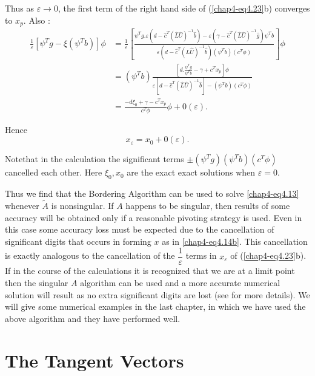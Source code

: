  Thus as $\varepsilon  \rightarrow 0$, the first term of the right
 hand side of (\ref{chap4-eq4.23}b) converges to $x_p$. Also : 
{\fontsize{10pt}{12pt}\selectfont
  \begin{align*}
\frac{1}{\varepsilon }[\psi ^T g- \xi (\psi ^Tb)]\phi
&=\frac{1}{\varepsilon } \left[ \frac{\psi ^T g.\varepsilon
    (d-\hat{c}^T(\hat{L}\hat{U}) ^{-1}\hat{b}) -
    \varepsilon  ( \gamma- \hat{c}^T
    (\hat{L}\hat{U})^{-1}\hat{g}) \psi ^T b}{\varepsilon
    (d-\hat{c}^T (\hat{L}\hat{U})^{-1}\hat{b})(\psi ^T
    b)(c ^T \phi)} \right] \phi\\[3pt] 
&=(\psi ^T b ) \frac{ \left[d. \frac{\psi ^T g}{\psi ^T b}- \gamma + c^T x_p
  \right] \phi}{\varepsilon \left[d-\hat{c}^T
    (\hat{L}\hat{U})^{-1}\hat{b} \right]- (\psi ^T b)(c ^T \phi
  )}\\[3pt] 
&= \frac{-d \xi _0 +\gamma - c^T x_p}{c^T \phi }\phi + 0 (\varepsilon
). 
 \end{align*}}\relax
 
Hence 
$$
x_\varepsilon  = x_0 +0 (\varepsilon ). 
$$
 
Note\pageoriginale that in the calculation the significant terms $\pm
(\psi ^T g)(\psi ^T b) (c^T \phi)$  cancelled each other. Here $\xi
_0, x_0$ are the exact exact solutions when $\varepsilon  = 0$. 
 
 Thus we find that the Bordering Algorithm can be used to solve
 \eqref{chap4-eq4.13} whenever $\widetilde {A}$ is nonsingular. If $A$
 happens to 
 be singular, then results of some accuracy will be obtained only if a
 reasonable  pivoting strategy is used. Even in this case some
 accuracy loss must be expected due to the  cancellation of significant
 digits that occurs in forming $x$ as in \eqref{chap4-eq4.14b}. 
 This cancellation
 is exactly analogous to the cancellation of the
 $\dfrac{1}{\varepsilon }$ terms in $x_\varepsilon  $ of
 (\ref{chap4-eq4.23}b). If 
 in the course of the calculations it is recognized that we are at a
 limit point then the singular $A$ algorithm can be used and a more
 accurate numerical solution  will result as no extra  significant
 digits are lost (see \cite{key17} for more details). We will give some
 numerical examples in the last chapter, in which we have used  the
 above algorithm and they have performed well.  


 \section*{The Tangent Vectors}
 
